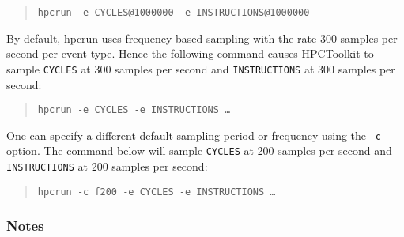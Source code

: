 \begin{quote}
\begin{verbatim}
hpcrun -e CYCLES@1000000 -e INSTRUCTIONS@1000000
\end{verbatim}
\end{quote}

By default, hpcrun uses frequency-based sampling with the rate
300 samples per second per event type. Hence the following command causes HPCToolkit to
sample \verb|CYCLES| at 300 samples per second and \verb|INSTRUCTIONS| at 300 samples per second:

\begin{quote}
\begin{verbatim}
hpcrun -e CYCLES -e INSTRUCTIONS …
\end{verbatim}
\end{quote}

One can specify a different default sampling period or frequency using the \verb|-c| option. 
The command below will sample \verb|CYCLES| at 200 samples per second and \verb|INSTRUCTIONS| at 200 samples per second:

\begin{quote}
\begin{verbatim}
hpcrun -c f200 -e CYCLES -e INSTRUCTIONS …
\end{verbatim}
\end{quote}



\subsubsection{Notes}

